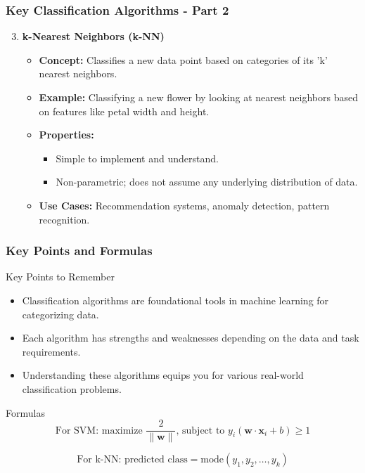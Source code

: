 \documentclass[aspectratio=169]{beamer}
\begin{document}
\begin{frame}[fragile]
    \frametitle{Key Classification Algorithms - Part 2}
    \begin{enumerate}
        \setcounter{enumi}{2} %
        \item \textbf{k-Nearest Neighbors (k-NN)}
            \begin{itemize}
                \item \textbf{Concept:} Classifies a new data point based on categories of its 'k' nearest neighbors.
                \item \textbf{Example:} Classifying a new flower by looking at nearest neighbors based on features like petal width and height.
                \item \textbf{Properties:}
                    \begin{itemize}
                        \item Simple to implement and understand.
                        \item Non-parametric; does not assume any underlying distribution of data.
                    \end{itemize}
                \item \textbf{Use Cases:} Recommendation systems, anomaly detection, pattern recognition.
            \end{itemize}
    \end{enumerate}
\end{frame}

\begin{frame}[fragile]
    \frametitle{Key Points and Formulas}
    \begin{block}{Key Points to Remember}
        \begin{itemize}
            \item Classification algorithms are foundational tools in machine learning for categorizing data.
            \item Each algorithm has strengths and weaknesses depending on the data and task requirements.
            \item Understanding these algorithms equips you for various real-world classification problems.
        \end{itemize}
    \end{block}

    \begin{block}{Formulas}
        \begin{equation}
            \text{For SVM: maximize } \frac{2}{\|\mathbf{w}\|} \text{, subject to } y_i(\mathbf{w} \cdot \mathbf{x}_i + b) \geq 1
        \end{equation}
        
        \begin{equation}
            \text{For k-NN: predicted class} = \text{mode}(y_{1}, y_{2}, \ldots, y_{k})
        \end{equation}
    \end{block}
\end{frame}
\end{document}
